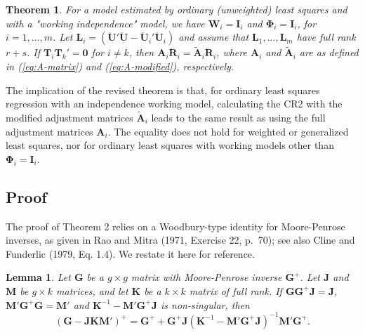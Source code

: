 \documentclass[12pt]{article}
\newtheorem*{thm}{Theorem}
\newtheorem{lem}{Lemma}
\begin{document}
\begin{thm}
\label{thm:absorb}
For a model estimated by ordinary (unweighted) least squares and with a "working independence" model, we have $\mathbf{W}_i = \mathbf{I}_i$ and $\boldsymbol\Phi_i = \mathbf{I}_i$, for $i = 1,...,m$. 
Let $\mathbf{L}_i = \left(\mathbf{\ddot{U}}'\mathbf{\ddot{U}} - \mathbf{\ddot{U}}_i'\mathbf{\ddot{U}}_i\right)$ and assume that $\mathbf{L}_1,...,\mathbf{L}_m$ have full rank $r + s$. If $\mathbf{T}_i \mathbf{T}_k' = \mathbf{0}$ for $i \neq k$, then $\mathbf{A}_i \mathbf{\ddot{R}}_i = \mathbf{\tilde{A}}_i \mathbf{\ddot{R}}_i$, where $\mathbf{A}_i$ and $\tilde{\mathbf{A}}_i$ are as defined in (\ref{eq:A-matrix}) and (\ref{eq:A-modified}), respectively.
\end{thm}

The implication of the revised theorem is that, for ordinary least
squares regression with an independence working model, calculating the
CR2 with the modified adjustment matrices \(\tilde{\mathbf{A}}_i\) leads
to the same result as using the full adjustment matrices
\(\mathbf{A}_i\). The equality does not hold for weighted or generalized
least squares, nor for ordinary least squares with working models other
than \(\boldsymbol\Phi_i = \mathbf{I}_i\).

\hypertarget{proof}{%
\subsection{Proof}\label{proof}}

The proof of Theorem 2 relies on a Woodbury-type identity for
Moore-Penrose inverses, as given in Rao and Mitra (1971, Exercise 22,
p.~70); see also Cline and Funderlic (1979, Eq. 1.4). We restate it here
for reference.

\begin{lem}
\label{lemma}
Let $\mathbf{G}$ be a $g \times g$ matrix with Moore-Penrose inverse $\mathbf{G}^+$. Let $\mathbf{J}$ and $\mathbf{M}$ be $g \times k$ matrices, and let $\mathbf{K}$ be a $k \times k$ matrix of full rank. If $\mathbf{G} \mathbf{G}^+ \mathbf{J} = \mathbf{J}$, $\mathbf{M}' \mathbf{G}^+ \mathbf{G} = \mathbf{M}'$ and $\mathbf{K}^{-1} - \mathbf{M}' \mathbf{G}^+ \mathbf{J}$ is non-singular, then
\begin{equation}
\left(\mathbf{G} - \mathbf{J} \mathbf{K} \mathbf{M}'\right)^+ = \mathbf{G}^+ + \mathbf{G}^+ \mathbf{J}\left( \mathbf{K}^{-1} - \mathbf{M}' \mathbf{G}^+ \mathbf{J}\right)^{-1} \mathbf{M}'\mathbf{G}^+.
\end{equation}
\end{lem}
\end{document}
